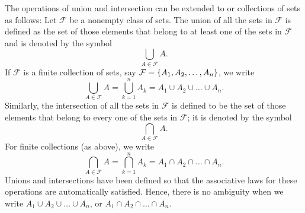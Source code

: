 \begin{defn}\label{defn:1.2.9}
  The operations of union and intersection can be extended to \textbf{} or \textbf{} collections of sets as follows:
  Let \(\mathcal{F}\) be a nonempty class of sets.
  The union of all the sets in \(\mathcal{F}\) is defined as the set of those elements that belong to at least one of the sets in \(\mathcal{F}\) and is denoted by the symbol
  \[
    \bigcup_{A \in \mathcal{F}} A.
  \]
  If \(\mathcal{F}\) is a finite collection of sets, say \(\mathcal{F} = \left\lbrace A_1, A_2, \dots, A_n\right\rbrace\), we write
  \[
    \bigcup_{A \in \mathcal{F}} A = \bigcup_{k = 1}^n A_k = A_1 \cup A_2 \cup \dots \cup A_n.
  \]
  Similarly, the intersection of all the sets in \(\mathcal{F}\) is defined to be the set of those elements that belong to every one of the sets in \(\mathcal{F}\);
  it is denoted by the symbol
  \[
    \bigcap_{A \in \mathcal{F}} A.
  \]
  For finite collections (as above), we write
  \[
    \bigcap_{A \in \mathcal{F}} A = \bigcap_{k = 1}^n A_k = A_1 \cap A_2 \cap \dots \cap A_n.
  \]
  Unions and intersections have been defined so that the associative laws for these operations are automatically satisfied.
  Hence, there is no ambiguity when we write \(A_1 \cup A_2 \cup \dots \cup A_n\), or \(A_1 \cap A_2 \cap \dots \cap A_n\).
\end{defn}
